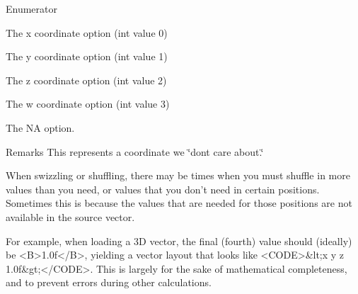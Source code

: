 \begin{Desc}
\item[Enumerator]\par
\begin{description}
\item[{\em 
\hypertarget{namespacegfxmath_a8930e63e96e91796ede30a8378b19d0bad0d09e689002558ad9843a534c0be86e}{}X\label{namespacegfxmath_a8930e63e96e91796ede30a8378b19d0bad0d09e689002558ad9843a534c0be86e}
}]The x coordinate option (int value 0) \item[{\em 
\hypertarget{namespacegfxmath_a8930e63e96e91796ede30a8378b19d0badd0e5340138dca954913bc9378f1c228}{}Y\label{namespacegfxmath_a8930e63e96e91796ede30a8378b19d0badd0e5340138dca954913bc9378f1c228}
}]The y coordinate option (int value 1) \item[{\em 
\hypertarget{namespacegfxmath_a8930e63e96e91796ede30a8378b19d0ba15f9e08071113483f5106cf0ba08e502}{}Z\label{namespacegfxmath_a8930e63e96e91796ede30a8378b19d0ba15f9e08071113483f5106cf0ba08e502}
}]The z coordinate option (int value 2) \item[{\em 
\hypertarget{namespacegfxmath_a8930e63e96e91796ede30a8378b19d0ba9589e88a1f2f02c189304aab6a2629f2}{}W\label{namespacegfxmath_a8930e63e96e91796ede30a8378b19d0ba9589e88a1f2f02c189304aab6a2629f2}
}]The w coordinate option (int value 3) \item[{\em 
\hypertarget{namespacegfxmath_a8930e63e96e91796ede30a8378b19d0baa2f2f53ce2dc4111dbf16ba3d31692f7}{}N\+A\label{namespacegfxmath_a8930e63e96e91796ede30a8378b19d0baa2f2f53ce2dc4111dbf16ba3d31692f7}
}]The N\+A option. \begin{DoxyRemark}{Remarks}
This represents a coordinate we \char`\"{}don\textquotesingle{}t care about.\char`\"{} \begin{DoxyVerb}          When swizzling or shuffling, there may be times when you must shuffle in
          more values than you need, or values that you don't need in certain positions.  Sometimes this is
          because the values that are needed for those positions are not available in the source vector.

          For example, when loading a 3D vector, the final (fourth) value should (ideally) be <B>1.0f</B>,
          yielding a vector layout that looks like <CODE>&lt;x y z 1.0f&gt;</CODE>.
          This is largely for the sake of mathematical completeness, and to prevent errors during other calculations.


\end{DoxyVerb}
\end{DoxyRemark}
\end{description}
\end{Desc}
